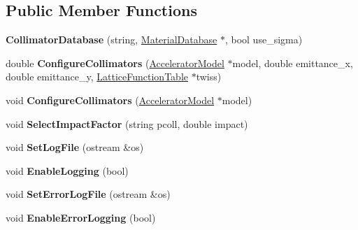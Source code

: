 \subsection*{Public Member Functions}
\begin{DoxyCompactItemize}
\item 
\mbox{\label{classCollimatorDatabase_a522d3f54bdfcff69de497b91ea8c062b}} 
{\bfseries Collimator\+Database} (string, \hyperlink{classMaterialDatabase}{Material\+Database} $\ast$, bool use\+\_\+sigma)
\item 
\mbox{\label{classCollimatorDatabase_a79ae3c3797a924c0275bcf0d01233f24}} 
double {\bfseries Configure\+Collimators} (\hyperlink{classAcceleratorModel}{Accelerator\+Model} $\ast$model, double emittance\+\_\+x, double emittance\+\_\+y, \hyperlink{classLatticeFunctionTable}{Lattice\+Function\+Table} $\ast$twiss)
\item 
\mbox{\label{classCollimatorDatabase_a7586e2ed55ceb3f6629a1c238139bfd5}} 
void {\bfseries Configure\+Collimators} (\hyperlink{classAcceleratorModel}{Accelerator\+Model} $\ast$model)
\item 
\mbox{\label{classCollimatorDatabase_a3148664be49eb8d4b769b6dacbdaa8fd}} 
void {\bfseries Select\+Impact\+Factor} (string pcoll, double impact)
\item 
\mbox{\label{classCollimatorDatabase_a1f5c7ad93b128be19abe75f644b799aa}} 
void {\bfseries Set\+Log\+File} (ostream \&os)
\item 
\mbox{\label{classCollimatorDatabase_ac026ba83eb7f7cca7803b83db35a13a8}} 
void {\bfseries Enable\+Logging} (bool)
\item 
\mbox{\label{classCollimatorDatabase_aa0edd5394c70ac34799e938b45c74ca1}} 
void {\bfseries Set\+Error\+Log\+File} (ostream \&os)
\item 
\mbox{\label{classCollimatorDatabase_a92c66e0b048558a6dcd1c238f5c4c51d}} 
void {\bfseries Enable\+Error\+Logging} (bool)
\item 
\mbox{\label{classCollimatorDatabase_aff58a2e845593716bc6142c56a7839db}} 

\end{DoxyCompactItemize}
